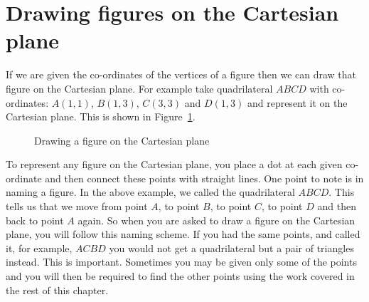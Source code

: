             \section{Drawing figures on the Cartesian plane}
            \nopagebreak
            \label{m39107*eip-728}If we are given the co-ordinates of the vertices of a figure then we can draw that figure on the Cartesian plane. For example take quadrilateral $ABCD$ with co-ordinates: $A(1,1)$, $B(1,3)$, $C(3,3)$ and $D(1,3)$ and represent it on the Cartesian plane. This is shown in Figure~\ref{fig:cartesianplane}.   
\par \label{m39107*eip-199}
    \setcounter{subfigure}{0}
	\begin{figure}[H] %
    \begin{center}
\caption{Drawing a figure on the Cartesian plane}
    \end{center}
\label{fig:cartesianplane}
 \end{figure}       
\par \label{m39107*eip-645}To represent any figure on the Cartesian plane, you place a dot at each given co-ordinate and then connect these points with straight lines. One point to note is in naming a figure. In the above example, we called the quadrilateral $ABCD$. This tells us that we move from point $A$, to point $B$, to point $C$, to point $D$ and then back to point $A$ again. So when you are asked to draw a figure on the Cartesian plane, you will follow this naming scheme. If you had the same points, and called it, for example, $ACBD$ you would not get a quadrilateral but a pair of triangles instead. This is important. Sometimes you may be given only some of the points and you will then be required to find the other points using the work covered in the rest of this chapter. \par \label{m39107*uid37}
